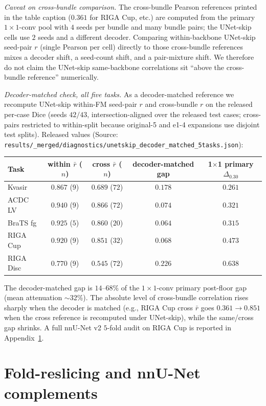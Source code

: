 \emph{Caveat on cross-bundle comparison.} The cross-bundle Pearson references printed in the table caption ($0.361$ for RIGA Cup, etc.) are computed from the primary $1{\times}1$-conv pool with $4$ seeds per bundle and many bundle pairs; the UNet-skip cells use $2$ seeds and a different decoder. Comparing within-backbone UNet-skip seed-pair $r$ (single Pearson per cell) directly to those cross-bundle references mixes a decoder shift, a seed-count shift, and a pair-mixture shift. We therefore do not claim the UNet-skip same-backbone correlations sit ``above the cross-bundle reference'' numerically.

\emph{Decoder-matched check, all five tasks.} As a decoder-matched reference we recompute UNet-skip within-FM seed-pair $r$ and cross-bundle $r$ on the released per-case Dice (seeds $42/43$, intersection-aligned over the released test cases; cross-pairs restricted to within-split because original-5 and e1-4 expansions use disjoint test splits). Released values (Source: \texttt{results/\_merged/diagnostics/unetskip\_decoder\_matched\_5tasks.json}):
\begin{center}\footnotesize
\begin{tabular}{lcccc}
\toprule
Task & within $\bar r$ ($n$) & cross $\bar r$ ($n$) & decoder-matched gap & 1$\times$1 primary $\Delta_{0.30}$ \\
\midrule
Kvasir       & $0.867$ ($9$) & $0.689$ ($72$) & $0.178$ & $0.261$ \\
ACDC LV      & $0.940$ ($9$) & $0.866$ ($72$) & $0.074$ & $0.321$ \\
BraTS fg     & $0.925$ ($5$) & $0.860$ ($20$) & $0.064$ & $0.315$ \\
RIGA Cup     & $0.920$ ($9$) & $0.851$ ($32$) & $0.068$ & $0.473$ \\
RIGA Disc    & $0.770$ ($9$) & $0.545$ ($72$) & $0.226$ & $0.638$ \\
\bottomrule
\end{tabular}
\end{center}
The decoder-matched gap is $14$--$68\%$ of the $1{\times}1$-conv primary post-floor gap (mean attenuation $\sim$32\%). The absolute level of cross-bundle correlation rises sharply when the decoder is matched (e.g., RIGA Cup cross $\bar r$ goes $0.361 \to 0.851$ when the cross reference is recomputed under UNet-skip), while the same/cross gap shrinks. A full nnU-Net v2 $5$-fold audit on RIGA Cup is reported in Appendix~\ref{app:nnunet}.



\section{Fold-reslicing and nnU-Net complements}
\label{app:nnunet}

